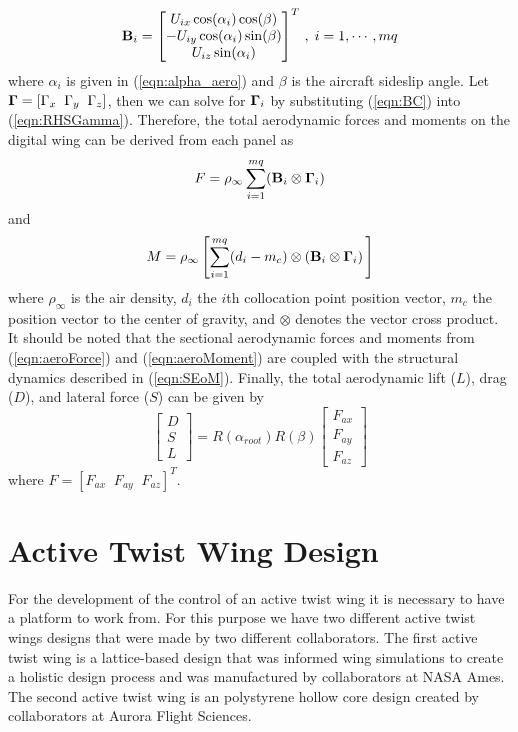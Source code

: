 \documentclass[11pt]{ucthesis}
\begin{document}
\begin{equation}
{\bf B}_{i} = \begin{bmatrix}U_{ix}\cos(\alpha_{i})\cos(\beta)\\ -U_{iy}\cos(\alpha_{i})\sin(\beta)\\ U_{iz}\sin(\alpha_{i})\end{bmatrix}^T \,,\;i=1,\cdots,mq
\label{eqn:BC}
\end{equation}
where $\alpha_i$ is given in (\ref{eqn:alpha_aero}) and $\beta$ is the aircraft sideslip angle. Let ${\bf \Gamma} = [\Gamma_x \;\; \Gamma_y \;\;\Gamma_z]$, then we can solve for ${\bf \Gamma}_i$ by substituting (\ref{eqn:BC}) into (\ref{eqn:RHSGamma}). Therefore, the total aerodynamic forces and moments on the digital wing can be derived from each panel as %
\begin{equation}
F = \rho_{\infty} \sum_{i=1}^{mq} ({\bf B}_i \otimes {\bf \Gamma}_i)
\label{eqn:aeroForce}
\end{equation}
and
\begin{equation}
M = \rho_{\infty} \left [ \sum_{i=1}^{mq} (d_i-m_c) \otimes ({\bf B}_i \otimes {\bf \Gamma}_i)\,\right ]
\label{eqn:aeroMoment}
\end{equation}
where $\rho_{\infty}$ is the air density, $d_i$ the $i$th collocation point position vector, $m_c$ the position vector to the center of gravity, and $\otimes$ denotes the vector cross product. It should be noted that the sectional aerodynamic forces and moments from (\ref{eqn:aeroForce}) and (\ref{eqn:aeroMoment}) are coupled with the structural dynamics described in (\ref{eqn:SEoM}). Finally, the total aerodynamic lift ($L$), drag ($D$), and lateral force ($S$) can be given by 
\begin{equation}
\begin{bmatrix}D\\S\\L\end{bmatrix} = R(\alpha_{root})R(\beta)\begin{bmatrix}F_{ax}\\F_{ay}\\F_{az}\end{bmatrix}
\label{eqn:LDS}
\end{equation}
where $F = [F_{ax} \;\;F_{ay} \;\; F_{az}]^{T}$.   

\chapter{Active Twist Wing Design}
For the development of the control of an active twist wing it is necessary to have a platform to work from. For this purpose we have two different active twist wings designs that were made by two different collaborators. The first active twist wing is a lattice-based design that was informed wing simulations to create a holistic design process and was manufactured by collaborators at NASA Ames. The second active twist wing is an polystyrene hollow core design created by collaborators at Aurora Flight Sciences.
\end{document}

